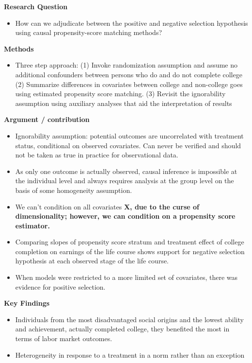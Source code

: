 \documentclass[
]{book}
\providecommand{\tightlist}{%
  \setlength{\itemsep}{0pt}\setlength{\parskip}{0pt}}
\begin{document}
\textbf{Research Question}

\begin{itemize}
\tightlist
\item
  How can we adjudicate between the positive and negative selection hypothesis using causal propensity-score matching methods?
\end{itemize}

\textbf{Methods}

\begin{itemize}
\tightlist
\item
  Three step approach: (1) Invoke randomization assumption and assume no additional confounders between persons who do and do not complete college (2) Summarize differences in covariates between college and non-college goes using estimated propensity score matching. (3) Revisit the ignorability assumption using auxiliary analyses that aid the interpretation of results
\end{itemize}

\textbf{Argument / contribution}

\begin{itemize}
\tightlist
\item
  Ignorability assumption: potential outcomes are uncorrelated with treatment status, conditional on observed covariates. Can never be verified and should not be taken as true in practice for observational data.
\item
  As only one outcome is actually observed, causal inference is impossible at the individual level and always requires analysis at the group level on the basis of some homogeneity assumption.
\item
  We can't condition on all covariates \bf{X}, due to the curse of dimensionality; however, we can condition on a propensity score estimator. 
\item
  Comparing slopes of propensity score stratum and treatment effect of college completion on earnings of the life course shows support for negative selection hypothesis at each observed stage of the life course.
\item
  When models were restricted to a more limited set of covariates, there was evidence for positive selection.
\end{itemize}

\textbf{Key Findings}

\begin{itemize}
\tightlist
\item
  Individuals from the most disadvantaged social origins and the lowest ability and achievement, actually completed college, they benefited the most in terms of labor market outcomes.
\item
  Heterogeneity in response to a treatment in a norm rather than an exception
\end{itemize}
\end{document}
